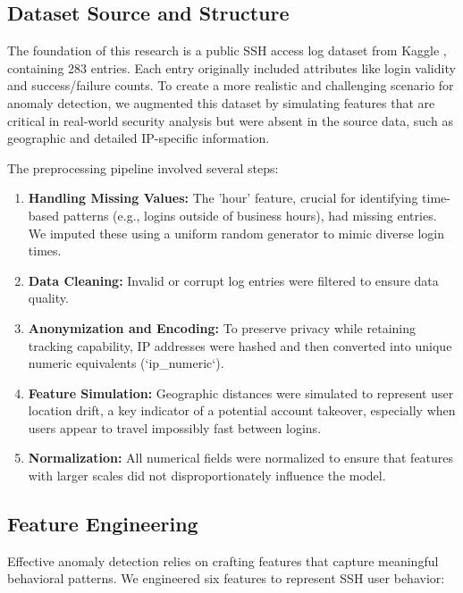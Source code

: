 \documentclass[conference]{IEEEtran}
\begin{document}
\subsection{Dataset Source and Structure}
The foundation of this research is a public SSH access log dataset from Kaggle \cite{osama_ssh_kaggle}, containing 283 entries. Each entry originally included attributes like login validity and success/failure counts. To create a more realistic and challenging scenario for anomaly detection, we augmented this dataset by simulating features that are critical in real-world security analysis but were absent in the source data, such as geographic and detailed IP-specific information.

The preprocessing pipeline involved several steps:
\begin{enumerate}
    \item \textbf{Handling Missing Values:} The 'hour' feature, crucial for identifying time-based patterns (e.g., logins outside of business hours), had missing entries. We imputed these using a uniform random generator to mimic diverse login times.
    \item \textbf{Data Cleaning:} Invalid or corrupt log entries were filtered to ensure data quality.
    \item \textbf{Anonymization and Encoding:} To preserve privacy while retaining tracking capability, IP addresses were hashed and then converted into unique numeric equivalents (`ip_numeric`).
    \item \textbf{Feature Simulation:} Geographic distances were simulated to represent user location drift, a key indicator of a potential account takeover, especially when users appear to travel impossibly fast between logins.
    \item \textbf{Normalization:} All numerical fields were normalized to ensure that features with larger scales did not disproportionately influence the model.
\end{enumerate}

\subsection{Feature Engineering}
Effective anomaly detection relies on crafting features that capture meaningful behavioral patterns. We engineered six features to represent SSH user behavior:
\end{document}
